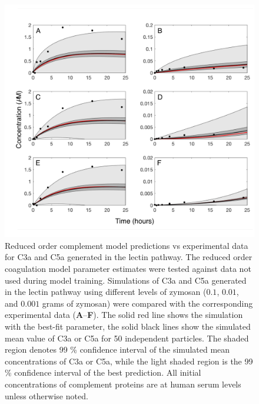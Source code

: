 \documentclass[12pt]{article}
\begin{document}
\begin{figure}[h]
\centering
\includegraphics[width=1.0\textwidth]{./figs/Figure3_predictions_final.pdf}
\caption{Reduced order complement model predictions vs experimental data for C3a and C5a generated in the lectin pathway. The reduced order coagulation model parameter estimates were tested against data not used during model training. Simulations of C3a and C5a generated in the lectin pathway using different levels of zymosan ($0.1$, $0.01$, and $0.001$ grams of zymosan) were compared with the corresponding experimental data (\textbf{A}--\textbf{F}). The solid red line shows the simulation with the best-fit parameter, the solid black lines show the simulated mean value of C3a or C5a for 50 independent particles. The shaded region denotes 99 \% confidence interval of the simulated mean concentrations of C3a or C5a, while the light shaded region is the 99 \% confidence interval of the best prediction. All initial concentrations of complement proteins are at human serum levels unless otherwise noted.
}\label{fig-prediction}
\end{figure}

\end{document}
